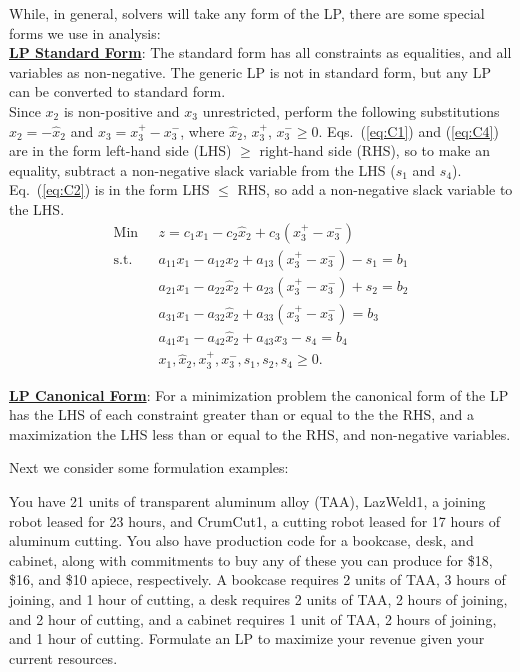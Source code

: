 While, in general, solvers will take any form of the LP, there are some special forms we use in analysis:\\

\medskip \underline{\bf LP Standard Form}: The standard form has all constraints as equalities, and all variables as non-negative.  The generic LP is not in standard form, but any LP can be converted to standard form. \\

Since $x_2$ is non-positive and $x_3$ unrestricted, perform the following substitutions $x_2=-\hat{x}_2$ and $x_3 = x_3^+ -x_3^-$, where $\hat{x}_2$, $x_3^+$, $x_3^- \ge 0$.   Eqs.~(\ref{eq:C1}) and (\ref{eq:C4}) are in the form left-hand side (LHS) $\ge$ right-hand side (RHS), so to make an equality, subtract a non-negative slack variable from the LHS ($s_1$ and $s_4$).  Eq.~(\ref{eq:C2}) is in the form LHS $\le$ RHS, so add a non-negative slack variable to the LHS.
\begin{align*}
\mbox{Min~~} & z = c_1x_1 - c_2\hat{x}_2 + c_3 (x_3^+ -x_3^-)  \\
\mbox{s.t.~~} & a_{11}x_1 - a_{12}x_2 + a_{13} (x_3^+ -x_3^-) - s_1 = b_1 \\
& a_{21}x_1 - a_{22}\hat{x}_2 + a_{23} (x_3^+ -x_3^-) + s_2 = b_2 \\
&  a_{31}x_1 - a_{32}\hat{x}_2 + a_{33} (x_3^+ -x_3^-) = b_3 \\
& a_{41}x_1 - a_{42}\hat{x}_2 + a_{43} x_3 - s_4 = b_4 \\
& x_1, \hat{x}_2, x_3^+, x_3^-, s_1, s_2, s_4 \ge 0.
\end{align*}

\medskip \underline{\bf  LP Canonical Form}: For a minimization problem the canonical form of the LP has the LHS of each constraint greater than or equal to the the RHS, and a maximization the LHS less than or equal to the RHS, and non-negative variables.

Next we consider some formulation examples:

 You have 21 units of transparent aluminum alloy (TAA), LazWeld1, a joining robot leased for 23 hours, and CrumCut1, a cutting robot leased for 17 hours of aluminum cutting. You also have production code for a bookcase, desk, and cabinet, along with commitments to buy any of these you can produce for \$18,  \$16, and  \$10 apiece, respectively.  A bookcase requires 2 units of TAA, 3 hours of joining, and 1 hour of cutting, a desk requires 2 units of TAA, 2 hours of joining, and 2 hour of cutting, and a cabinet requires 1 unit of TAA, 2 hours of joining, and 1 hour of cutting. Formulate an LP to maximize your revenue given your current resources.

